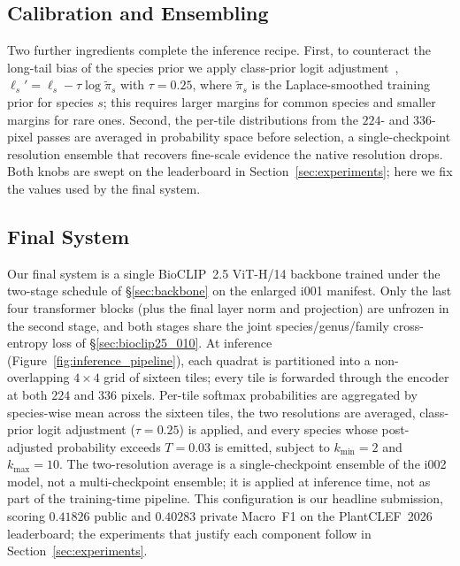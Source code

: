 \subsection{Calibration and Ensembling}
\label{sec:calibration}

Two further ingredients complete the inference recipe. First, to counteract the long-tail bias of
the species prior we apply class-prior logit adjustment~\cite{menon2021longtail},
$\ell_s' = \ell_s - \tau \log \tilde{\pi}_s$ with $\tau{=}0.25$, where $\tilde{\pi}_s$ is the
Laplace-smoothed training prior for species $s$; this requires larger margins for common species
and smaller margins for rare ones. Second, the per-tile distributions from the $224$- and
$336$-pixel passes are averaged in probability space before selection, a single-checkpoint
resolution ensemble that recovers fine-scale evidence the native resolution drops. Both knobs are
swept on the leaderboard in Section~\ref{sec:experiments}; here we fix the values used by the
final system.

\subsection{Final System}
\label{sec:final_submission}

Our final system is a single BioCLIP~2.5 ViT-H/14 backbone trained under the two-stage
schedule of \S\ref{sec:backbone} on the enlarged i001 manifest. Only the last four transformer
blocks (plus the final layer norm and projection) are unfrozen in the second stage, and both
stages share the joint species/genus/family cross-entropy loss of \S\ref{sec:bioclip25_010}. At
inference (Figure~\ref{fig:inference_pipeline}), each quadrat is
partitioned into a non-overlapping $4\times4$ grid of sixteen tiles; every tile is forwarded
through the encoder at both $224$ and $336$ pixels. Per-tile softmax probabilities are aggregated
by species-wise mean across the sixteen tiles, the two resolutions are averaged, class-prior logit
adjustment ($\tau{=}0.25$) is applied, and every species whose post-adjusted probability exceeds
$T{=}0.03$ is emitted, subject to $k_{\min}{=}2$ and $k_{\max}{=}10$. The two-resolution average is a single-checkpoint ensemble of the i002 model, not a
multi-checkpoint ensemble; it is applied at inference time, not as part of the training-time
pipeline. This configuration is our
headline submission, scoring $0.41826$ public and $0.40283$ private Macro~F1 on the PlantCLEF~2026
leaderboard; the experiments that justify each component follow in Section~\ref{sec:experiments}.

